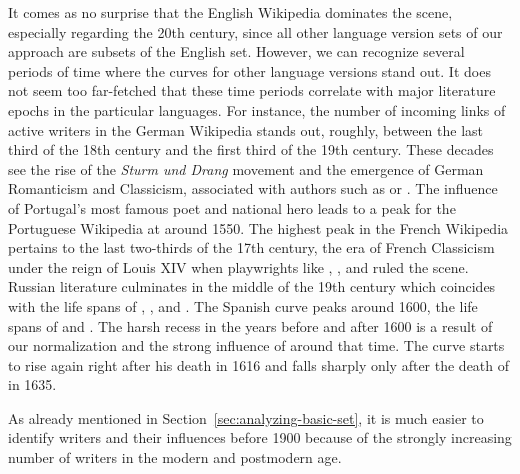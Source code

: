 \documentclass[a4paper,12pt]{scrartcl}
\begin{document}
It comes as no surprise that the English Wikipedia dominates the
scene, especially regarding the 20th century, since all other language
version sets of our approach are subsets of the English set.
%
However, we can recognize several periods of time where the curves for
other language versions stand out. It does not seem too far-fetched
that these time periods correlate with major literature epochs in the
particular languages. For instance, the number of incoming links of
active writers in the German Wikipedia stands out, roughly, between
the last third of the 18th century and the first third of the 19th
century.  These decades see the rise of the \emph{Sturm und Drang}
movement and the emergence of German Romanticism and Classicism,
associated with authors such as  or
.  The influence of Portugal's most famous
poet and national hero  leads to a peak for the
Portuguese Wikipedia at around 1550.  The highest peak in the French
Wikipedia pertains to the last two-thirds of the 17th century, the era
of French Classicism under the reign of Louis XIV when playwrights
like , , and
 ruled the scene.  Russian literature culminates in the
middle of the 19th century which coincides with the life spans of
, , and .  The Spanish curve peaks around 1600, the life spans
of  and .  The harsh recess in
the years before and after 1600 is a result of our normalization
and the strong influence of  around that time. The
curve starts to rise again right after his death in 1616 and falls
sharply only after the death of  in 1635.

\enlargethispage{\baselineskip}

%
As already mentioned in Section~\ref{sec:analyzing-basic-set}, it is
much easier to identify writers and their influences before 1900
because of the strongly increasing number of writers in the modern and
postmodern age.
\end{document}
